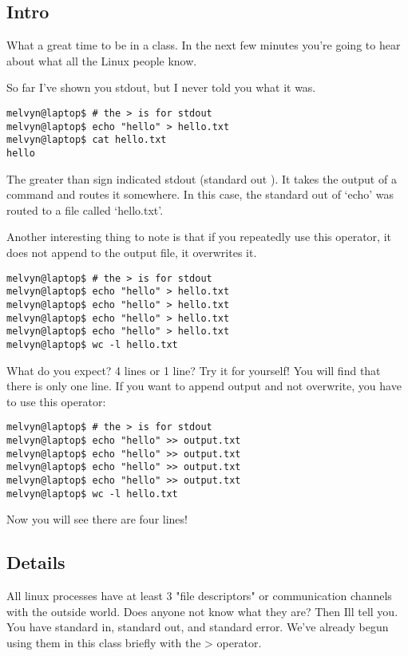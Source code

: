 \documentclass[10pt]{article}
\begin{document}
\subsection*{Intro}
What a great time to be in a class. In the next few minutes you're going to hear
about what all the Linux people know.

So far I've shown you stdout, but I never told you what it was.
\begin{lstlisting}[style=term]
melvyn@laptop$ # the > is for stdout
melvyn@laptop$ echo "hello" > hello.txt
melvyn@laptop$ cat hello.txt
hello
\end{lstlisting} 

The greater than sign indicated stdout (standard out ). It takes the output of a
command and routes it somewhere. In this case, the standard out of `echo' was
routed to a file called `hello.txt'.

Another interesting thing to note is that if you repeatedly use this operator,
it does not append to the output file, it overwrites it.

\begin{lstlisting}[style=term]
melvyn@laptop$ # the > is for stdout
melvyn@laptop$ echo "hello" > hello.txt
melvyn@laptop$ echo "hello" > hello.txt
melvyn@laptop$ echo "hello" > hello.txt
melvyn@laptop$ echo "hello" > hello.txt
melvyn@laptop$ wc -l hello.txt
\end{lstlisting} 

What do you expect? 4 lines or 1 line? Try it for yourself! You will find that
there is only one line. If you want to append output and not overwrite, you have
to use this operator:

\begin{lstlisting}[style=term]
melvyn@laptop$ # the > is for stdout
melvyn@laptop$ echo "hello" >> output.txt
melvyn@laptop$ echo "hello" >> output.txt
melvyn@laptop$ echo "hello" >> output.txt
melvyn@laptop$ echo "hello" >> output.txt
melvyn@laptop$ wc -l hello.txt
\end{lstlisting} 

Now you will see there are four lines!

\subsection*{Details}
All linux processes have at least 3 "file descriptors" or communication channels with the outside world. Does anyone not know what they are? Then Ill tell you. You have standard in, standard out, and standard error. We've already begun using them in this class briefly with the > operator. 
\end{document}
